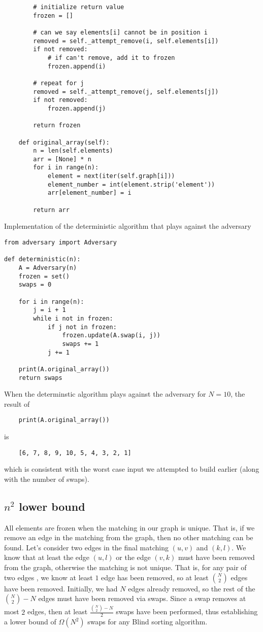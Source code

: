 \documentclass{article}
\begin{document}
\begin{verbatim}
        # initialize return value
        frozen = []

        # can we say elements[i] cannot be in position i
        removed = self._attempt_remove(i, self.elements[i])
        if not removed:
            # if can't remove, add it to frozen
            frozen.append(i)

        # repeat for j
        removed = self._attempt_remove(j, self.elements[j])
        if not removed:
            frozen.append(j)

        return frozen

    def original_array(self):
        n = len(self.elements)
        arr = [None] * n
        for i in range(n):
            element = next(iter(self.graph[i]))
            element_number = int(element.strip('element'))
            arr[element_number] = i

        return arr
\end{verbatim}

Implementation of the deterministic algorithm that plays against the adversary
\begin{verbatim}
from adversary import Adversary

def deterministic(n):
    A = Adversary(n)
    frozen = set()
    swaps = 0

    for i in range(n):
        j = i + 1
        while i not in frozen:
            if j not in frozen:
                frozen.update(A.swap(i, j))
                swaps += 1
            j += 1

    print(A.original_array())
    return swaps
\end{verbatim}

When the determinstic algorithm plays against the adversary for $N = 10$, the result of 
\begin{verbatim}
    print(A.original_array())
\end{verbatim}
is
\begin{verbatim}
    [6, 7, 8, 9, 10, 5, 4, 3, 2, 1]
\end{verbatim}
which is consistent with the worst case input we attempted to build earlier (along with the number of swaps).

\subsection{$n^2$ lower bound}
All elements are frozen when the matching in our graph is unique. That is, if we remove an edge
in the matching from the graph, then no other matching can be found. Let's consider two edges in the final
matching $(u, v)$ and $(k, l)$. We know that at least the edge $(u, l)$ or the edge $(v, k)$ must have been removed
from the graph, otherwise the matching is not unique. That is, for any pair of two edges
, we know at least $1$ edge has been removed, so at least ${N \choose 2}$ edges have been removed. Initially, we had $N$ edges
already removed, so the rest of the ${N \choose 2} - N$ edges must have been removed via swaps.
Since a swap removes at most $2$ edges, then at least $\frac{{N \choose 2} - N}{2}$ swaps have been performed,
thus establishing a lower bound of $\Omega(N^2)$ swaps for any Blind sorting algorithm.
\end{document}
